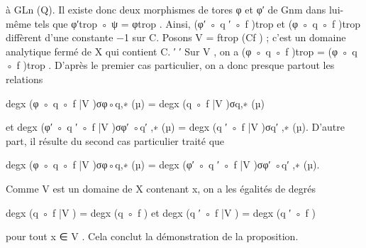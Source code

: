 \documentclass[
  10pt,
]{article}
\newenvironment{Shaded}{}{}
\newcommand{\NormalTok}[1]{#1}
\begin{document}
\begin{Shaded}
\begin{Highlighting}[]
\NormalTok{à GLn (Q). Il existe donc deux morphismes de tores φ et φ′ de Gnm dans lui{-}même tels}
\NormalTok{que φ′trop ◦ ψ = φtrop . Ainsi, (φ′ ◦ q ′ ◦ f )trop et (φ ◦ q ◦ f )trop diffèrent d’une constante}
\NormalTok{                       −1}
\NormalTok{sur C. Posons V = ftrop   (Cf ) ; c’est un domaine analytique fermé de X qui contient C.}
\NormalTok{                ′  ′}
\NormalTok{Sur V , on a (φ ◦ q ◦ f )trop = (φ ◦ q ◦ f )trop .}
\NormalTok{  D’après le premier cas particulier, on a donc presque partout les relations}

\NormalTok{                     degx (φ ◦ q ◦ f |V )σφ◦q,∗ (µ) = degx (q ◦ f |V )σq,∗ (µ)}

\NormalTok{et}
\NormalTok{                   degx (φ′ ◦ q ′ ◦ f |V )σφ′ ◦q′ ,∗ (µ) = degx (q ′ ◦ f |V )σq′ ,∗ (µ).}
\NormalTok{D’autre part, il résulte du second cas particulier traité que}

\NormalTok{                degx (φ ◦ q ◦ f |V )σφ◦q,∗ (µ) = degx (φ′ ◦ q ′ ◦ f |V )σφ′ ◦q′ ,∗ (µ).}

\NormalTok{Comme V est un domaine de X contenant x, on a les égalités de degrés}

\NormalTok{             degx (q ◦ f |V ) = degx (q ◦ f ) et         degx (q ′ ◦ f |V ) = degx (q ′ ◦ f )}

\NormalTok{pour tout x ∈ V . Cela conclut la démonstration de la proposition.}


\end{Highlighting}
\end{Shaded}
\end{document}
